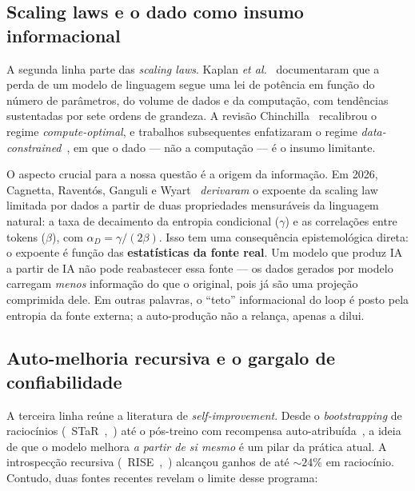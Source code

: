 \subsection{Scaling laws e o dado como insumo informacional}

A segunda linha parte das \emph{scaling laws}. Kaplan \textit{et
al.}~\parencite{Kaplan2020Scaling} documentaram que a perda de um modelo de
linguagem segue uma lei de potência em função do número de parâmetros, do volume
de dados e da computação, com tendências sustentadas por sete ordens de grandeza.
A revisão Chinchilla~\parencite{Hoffmann2022Chinchilla} recalibrou o regime
\emph{compute-optimal}, e trabalhos subsequentes
enfatizaram o regime \emph{data-constrained}~\parencite{Muennighoff2023DataConstrained},
em que o dado --- não a computação --- é o insumo limitante.

O aspecto crucial para a nossa questão é a origem da informação. Em 2026,
Cagnetta, Raventós, Ganguli e Wyart~\parencite{Cagnetta2026ScalingTheory}
\emph{derivaram} o expoente da scaling law limitada por dados a partir de duas
propriedades mensuráveis da linguagem natural: a taxa de decaimento da entropia
condicional ($\gamma$) e as correlações entre tokens ($\beta$), com
$\alpha_D = \gamma/(2\beta)$. Isso tem uma consequência epistemológica direta:
o expoente é função das \textbf{estatísticas da fonte real}. Um modelo que
produz IA a partir de IA não pode reabastecer essa fonte --- os dados gerados por
modelo carregam \emph{menos} informação do que o original, pois já são uma
projeção comprimida dele. Em outras palavras, o ``teto'' informacional do loop é
posto pela entropia da fonte externa; a auto-produção não a relança, apenas a
dilui.

\subsection{Auto-melhoria recursiva e o gargalo de confiabilidade}

A terceira linha reúne a literatura de \emph{self-improvement}. Desde o
\emph{bootstrapping} de raciocínios (~STaR~,~\textcite{Zelikman2022STaR}) até o
pós-treino com recompensa auto-atribuída~\parencite{Yuan2024SPIN}, a ideia de que
o modelo melhora \emph{a partir de si mesmo} é um pilar da prática atual. A
introspecção recursiva (~RISE~,~\textcite{Qu2024RISE}) alcançou ganhos de até
$\sim24\%$ em raciocínio. Contudo, duas fontes recentes revelam o limite desse
programa:

